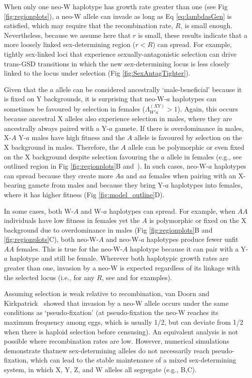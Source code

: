 \documentclass[10pt,letterpaper]{article}
\providecommand{\DIFaddtex}[1]{{\protect\color{blue}\uwave{#1}}} %
\providecommand{\DIFaddbegin}{} %
\providecommand{\DIFaddend}{} %
\providecommand{\DIFadd}[1]{\texorpdfstring{\DIFaddtex{#1}}{#1}} %
\newcommand{\DIFaddincludegraphics}[2][]{{\color{blue}\fbox{\DIFOincludegraphics[#1]{#2}}}} %
\DeclareRobustCommand{\DIFaddbegin}{\DIFOaddbegin \let\includegraphics\DIFaddincludegraphics} %
\DeclareRobustCommand{\DIFaddend}{\DIFOaddend \let\includegraphics\DIFOincludegraphics} %
\begin{document}

When only one neo-W haplotype has growth rate greater than one (see Fig \ref{fig:regionplots}), a neo-W allele can invade as long as Eq \eqref{eq:lambdasGen} is satisfied, which may require that the recombination rate, $R$, is small enough.
Nevertheless, because we assume here that $r$ is small, these results indicate that a more loosely linked sex-determining region ($r<R$) can spread.
For example, tightly sex-linked loci that experience sexually-antagonistic selection can drive trans-GSD transitions in which the new sex-determining locus is less closely linked to the locus under selection (Fig \ref{fig:SexAntagTighter}). 

Given that the $a$ allele can be considered ancestrally `male-beneficial' because it is fixed on Y backgrounds, it is surprising that neo-W-$a$ haplotypes can sometimes be favoured by selection in females ($\Lambda_{W'a}^{(XY)}>1$). 
Again, this occurs because ancestral X alleles also experience selection in males, where they are ancestrally always paired with a Y-$a$ gamete. 
If there is overdominance in males, X-$A$ Y-$a$ males have high fitness and the $A$ allele is favoured by selection on the X background in males. 
Therefore, the $A$ allele can be polymorphic or even fixed on the X background despite selection favouring the $a$ allele in females (e.g., see outlined region in Fig \ref{fig:regionplots}B and~\cite{Lloyd1977,Otto2014}). 
In such cases, neo-W-$a$ haplotypes can spread because they create more $Aa$ and $aa$ females when pairing with an X-bearing gamete from males and because they bring Y-$a$ haplotypes into females, where it has higher fitness (Fig \ref{fig:model_outline}D). 

In some cases, both W-$A$ and W-$a$ haplotypes can spread.
For example, when $AA$ individuals have low fitness in females yet the $A$ is polymorphic or fixed on the X background due to overdominance in males (Fig \ref{fig:regionplots}B and \ref{fig:regionplots}C), both neo-W-$A$ and neo-W-$a$ haplotypes produce fewer unfit $AA$ females.
This is true for the neo-W-$A$ haplotype because it can pair with a Y-$a$ haplotype and still be female. 
Wherever both haplotypic growth rates are greater than one, invasion by a neo-W is expected regardless of its linkage with the selected locus (i.e., for any $R$, see  and  for examples). 

Assuming selection is weak relative to recombination, van Doorn and Kirkpatrick~\cite{vanDoorn:2010hu} showed that invasion by a neo-W allele occurs under the same conditions as `pseudo-fixation' (at pseudo-fixation the neo-W reaches its maximum frequency among eggs, which is usually 1/2, but can deviate from 1/2 when there is haploid selection before censusing). 
An equivalent analysis is not possible where recombination rates are low. 
However, numerical simulations demonstrate that\DIFaddbegin \DIFadd{, with tight sex linkage, }\DIFaddend new sex-determining alleles do not necessarily reach pseudo-fixation, which can lead to the stable maintenance of a mixed sex-determining system, in which X, Y, Z, and W alleles all segregate (e.g., B,C). 
\end{document}

